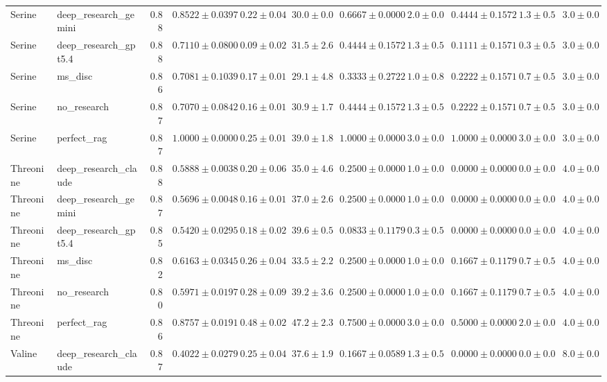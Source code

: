 \begin{table}[htbp]
\begin{tabular}{llrrrrrrrrr}
Serine & deep_research_gemini & 0.88 & $0.8522 \pm 0.0397$ & $0.22 \pm 0.04$ & $30.0 \pm 0.0$ & $0.6667 \pm 0.0000$ & $2.0 \pm 0.0$ & $0.4444 \pm 0.1572$ & $1.3 \pm 0.5$ & $3.0 \pm 0.0$ \\
Serine & deep_research_gpt5.4 & 0.88 & $0.7110 \pm 0.0800$ & $0.09 \pm 0.02$ & $31.5 \pm 2.6$ & $0.4444 \pm 0.1572$ & $1.3 \pm 0.5$ & $0.1111 \pm 0.1571$ & $0.3 \pm 0.5$ & $3.0 \pm 0.0$ \\
Serine & ms_disc & 0.86 & $0.7081 \pm 0.1039$ & $0.17 \pm 0.01$ & $29.1 \pm 4.8$ & $0.3333 \pm 0.2722$ & $1.0 \pm 0.8$ & $0.2222 \pm 0.1571$ & $0.7 \pm 0.5$ & $3.0 \pm 0.0$ \\
Serine & no_research & 0.87 & $0.7070 \pm 0.0842$ & $0.16 \pm 0.01$ & $30.9 \pm 1.7$ & $0.4444 \pm 0.1572$ & $1.3 \pm 0.5$ & $0.2222 \pm 0.1571$ & $0.7 \pm 0.5$ & $3.0 \pm 0.0$ \\
Serine & perfect_rag & 0.87 & \cellcolor{green!25}$1.0000 \pm 0.0000$ & $0.25 \pm 0.01$ & $39.0 \pm 1.8$ & $1.0000 \pm 0.0000$ & $3.0 \pm 0.0$ & $1.0000 \pm 0.0000$ & $3.0 \pm 0.0$ & $3.0 \pm 0.0$ \\
\midrule
Threonine & deep_research_claude & 0.88 & $0.5888 \pm 0.0038$ & $0.20 \pm 0.06$ & $35.0 \pm 4.6$ & $0.2500 \pm 0.0000$ & $1.0 \pm 0.0$ & $0.0000 \pm 0.0000$ & $0.0 \pm 0.0$ & $4.0 \pm 0.0$ \\
Threonine & deep_research_gemini & 0.87 & $0.5696 \pm 0.0048$ & $0.16 \pm 0.01$ & $37.0 \pm 2.6$ & $0.2500 \pm 0.0000$ & $1.0 \pm 0.0$ & $0.0000 \pm 0.0000$ & $0.0 \pm 0.0$ & $4.0 \pm 0.0$ \\
Threonine & deep_research_gpt5.4 & 0.85 & \cellcolor{red!25}$0.5420 \pm 0.0295$ & $0.18 \pm 0.02$ & $39.6 \pm 0.5$ & $0.0833 \pm 0.1179$ & $0.3 \pm 0.5$ & $0.0000 \pm 0.0000$ & $0.0 \pm 0.0$ & $4.0 \pm 0.0$ \\
Threonine & ms_disc & 0.82 & $0.6163 \pm 0.0345$ & $0.26 \pm 0.04$ & $33.5 \pm 2.2$ & $0.2500 \pm 0.0000$ & $1.0 \pm 0.0$ & $0.1667 \pm 0.1179$ & $0.7 \pm 0.5$ & $4.0 \pm 0.0$ \\
Threonine & no_research & 0.80 & $0.5971 \pm 0.0197$ & $0.28 \pm 0.09$ & $39.2 \pm 3.6$ & $0.2500 \pm 0.0000$ & $1.0 \pm 0.0$ & $0.1667 \pm 0.1179$ & $0.7 \pm 0.5$ & $4.0 \pm 0.0$ \\
Threonine & perfect_rag & 0.86 & \cellcolor{green!25}$0.8757 \pm 0.0191$ & $0.48 \pm 0.02$ & $47.2 \pm 2.3$ & $0.7500 \pm 0.0000$ & $3.0 \pm 0.0$ & $0.5000 \pm 0.0000$ & $2.0 \pm 0.0$ & $4.0 \pm 0.0$ \\
\midrule
Valine & deep_research_claude & 0.87 & \cellcolor{red!25}$0.4022 \pm 0.0279$ & $0.25 \pm 0.04$ & $37.6 \pm 1.9$ & $0.1667 \pm 0.0589$ & $1.3 \pm 0.5$ & $0.0000 \pm 0.0000$ & $0.0 \pm 0.0$ & $8.0 \pm 0.0$ \\

\end{tabular}
\end{table}
